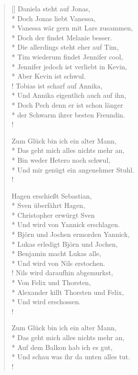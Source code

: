 \documentclass[a4paper,12pt,notitlepage]{article}
\begin{document}
  \begin{verse}[\versewidth]
	  Daniela steht auf Jonas, \\*
	  Doch Jonas liebt Vanessa, \\*
		Vanessa wär gern mit Lars zusammen, \\*
		Doch der findet Melanie besser. \\*
		Die allerdings steht eher auf Tim, \\*
		Tim wiederum findet Jennifer cool, \\*
		Jennifer jedoch ist verliebt in Kevin, \\*
		Aber Kevin ist schwul. \\!
		Tobias ist scharf auf Annika, \\*
		Und Annika eigentlich auch auf ihn, \\*
		Doch Pech denn er ist schon länger \\*
		der Schwarm ihrer besten Freundin. \\!


		Zum Glück bin ich ein alter Mann, \\*
		Das geht mich alles nichts mehr an, \\*
		Bin weder Hetero noch schwul, \\*
		Und mir genügt ein angenehmer Stuhl. \\!

		Hagen erschießt Sebastian, \\*
		Sven überfährt Hagen, \\*
		Christopher erwürgt Sven \\*
		Und wird von Yannick erschlagen. \\*
		Björn und Jochen ermorden Yannick, \\*
		Lukas erledigt Björn und Jochen, \\*
		Benjamin macht Lukas alle, \\*
		Und wird von Nils erstochen. \\!
		Nils wird daraufhin abgemurkst, \\*
		Von Felix und Thorsten, \\*
		Alexander killt Thorsten und Felix, \\*
		Und wird erschossen. \\!

		Zum Glück bin ich ein alter Mann, \\*
		Das geht mich alles nichts mehr an, \\*
		Auf dem Balkon hab ich es gut, \\*
		Und schau was ihr da unten alles tut. \\!


\end{verse}
\end{document}
